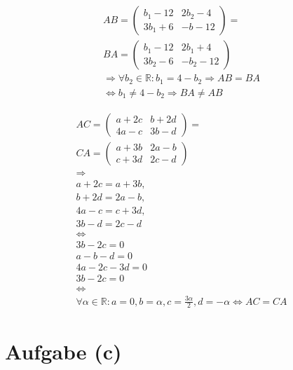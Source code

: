 \documentclass{article}
\begin{document}
    \begin{align*}
        AB = \begin{pmatrix}
            b_1 - 12 & 2b_2-4 \\
            3b_1 + 6 & -b-12
        \end{pmatrix} = \\
        BA = \begin{pmatrix}
            b_1 - 12 & 2b_1 + 4 \\
            3b_2 - 6 & -b_2-12
        \end{pmatrix}\\
        \Rightarrow \forall b_2 \in \mathbb{R}: b_1 = 4 - b_2 \Rightarrow AB = BA\\ 
        \Leftrightarrow b_1 \neq 4 - b_2 \Rightarrow BA \neq AB
    \end{align*}
    \newpage

    \begin{gather*}
        AC = \begin{pmatrix}
            a + 2c & b + 2d \\
            4a - c & 3b - d
        \end{pmatrix} = \\
        CA = \begin{pmatrix}
            a + 3b & 2a - b \\
            c + 3d & 2c - d
        \end{pmatrix}\\
        \Rightarrow\\ 
        a + 2c = a + 3b, \\
        b + 2d = 2a - b, \\
        4a - c = c + 3d, \\
        3b - d = 2c - d \\
        \Leftrightarrow\\
        3b -2c = 0\\
        a -b -d = 0\\
        4a - 2c - 3d=0\\
        3b - 2c = 0\\
        \Leftrightarrow\\
        \forall \alpha \in \mathbb{R}: a = 0, b = \alpha, c = \frac{3\alpha}2, d = -\alpha \Leftrightarrow AC = CA
    \end{gather*}

    \section{Aufgabe (c)}
\end{document}
